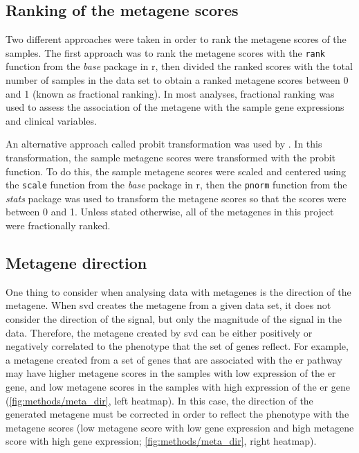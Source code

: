 \subsection{Ranking of the metagene scores}
\label{sub:ranking_of_the_metagene_scores}

Two different approaches were taken in order to rank the metagene scores of the samples.
The first approach was to rank the metagene scores with the \texttt{rank} function from the \textit{base} package in \gls{r}, then divided the ranked scores with the total number of samples in the data set to obtain a ranked metagene scores between 0 and 1 (known as fractional ranking).
In most analyses, fractional ranking was used to assess the association of the metagene with the sample gene expressions and clinical variables.

An alternative approach called probit transformation was used by \citet{Gatza2010a}.
In this transformation, the sample metagene scores were transformed with the probit function.
To do this, the sample metagene scores were scaled and centered using the \texttt{scale} function from the \textit{base} package in \gls{r}, then the \texttt{pnorm} function from the \textit{stats} package was used to transform the metagene scores so that the scores were between 0 and 1.
Unless stated otherwise, all of the metagenes in this project were fractionally ranked.

\subsection{Metagene direction}
\label{sub:metagene_direction}

One thing to consider when analysing data with metagenes is the direction of the metagene.
When \gls{svd} creates the metagene from a given data set, it does not consider the direction of the signal, but only the magnitude of the signal in the data.
Therefore, the metagene created by \gls{svd} can be either positively or negatively correlated to the phenotype that the set of genes reflect.
For example, a metagene created from a set of genes that are associated with the \gls{er} pathway may have higher metagene scores in the samples with low expression of the \gls{er} gene, and low metagene scores in the samples with high expression of the \gls{er} gene (\cref{fig:methods/meta_dir}, left heatmap).
In this case, the direction of the generated metagene must be corrected in order to reflect the phenotype with the metagene scores (low metagene score with low gene expression and high metagene score with high gene expression; \cref{fig:methods/meta_dir}, right heatmap).

